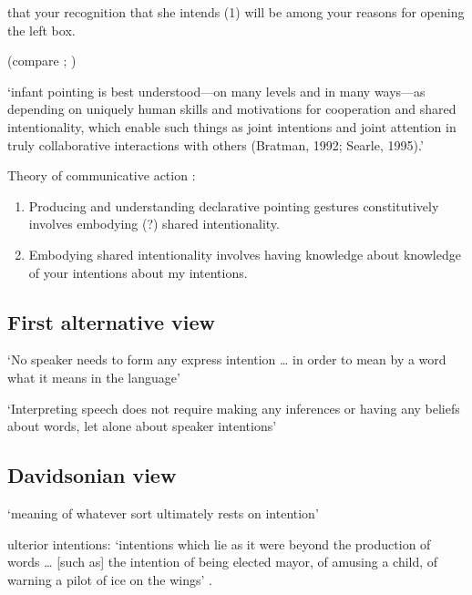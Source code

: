 \documentclass[12pt]{extarticle}
\begin{document}
\begin{multicols}{3}
\begin{enumerate}
that your recognition that she intends (1) will be among your reasons for opening the left box.
 
\end{enumerate}
 
(compare \citealp[p.\ 151]{Grice:1969pv}; \citealp[p.\ 544]{Neale:1992uw})
 
‘infant pointing is best understood---on many levels and in many ways---as depending on uniquely human skills and motivations for cooperation and shared intentionality, which enable such things as joint intentions and joint attention in truly collaborative interactions with others (Bratman, 1992; Searle, 1995).’
\citep[p.\ 706]{Tomasello:2007fi}
 
Theory of communicative action \citep[compare][]{Tomasello:2007fi}:
 
\begin{enumerate}
 
\item
 
Producing and understanding declarative pointing gestures constitutively involves embodying (?) shared intentionality.
 
\item
 
Embodying shared intentionality involves having knowledge about knowledge of your intentions about my intentions.
 
\end{enumerate}
 
\subsection{First alternative view}
 
‘No speaker needs to form any express intention … in order to mean by a word what it means in the language’
\citep[p.\ 473]{Dummett:1986mq}
 
‘Interpreting speech does not require making any inferences or having any beliefs about words, let alone about speaker intentions’
\citep[p.\ 62]{Millikan:1984ib}
 
\subsection{Davidsonian view}
 
‘meaning of whatever sort ultimately rests on intention’
\citep[p.\ 298]{Davidson:1992pl}
 
ulterior intentions: ‘intentions which lie as it were beyond the production of words … [such as] the intention of being elected mayor, of amusing a child, of warning a pilot of ice on the wings’ \citep[p.\ 298]{Davidson:1992pl}.
 

\end{multicols}
\end{document}
